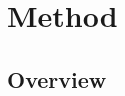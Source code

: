 \documentclass{article}
\begin{document}











\section{Method}

\subsection{Overview}
\end{document}
